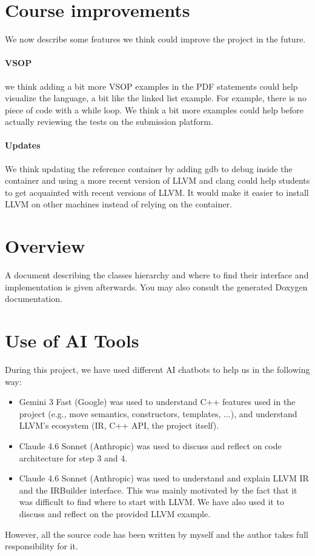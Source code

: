 \documentclass{article}
\begin{document}
\section{Course improvements}
We now describe some features we think could improve the project in the future.

\paragraph{VSOP} we think adding a bit more VSOP examples in the PDF statements could help visualize the language, a bit like the linked list example. For example, there is no piece of code with a while loop. We think a bit more examples could help before actually reviewing the tests on the submission platform.

\paragraph{Updates}
We think updating the reference container by adding gdb to debug inside the container and using a more recent version of LLVM and clang could help students to get acquainted with recent versions of LLVM. It would make it easier to install LLVM on other machines instead of relying on the container.

\appendix

\section{Overview}

A document describing the classes hierarchy and where to find their interface and implementation is given afterwards. You may also consult the generated Doxygen documentation.

\section{Use of AI Tools}

During this project, we have used different AI chatbots to help us in the following way:

\begin{itemize}
    \item Gemini 3 Fast (Google) was used to understand C++ features used in the project (e.g., move semantics, constructors, templates, ...), and understand LLVM's ecosystem (IR, C++ API, the project itself).
    \item Claude 4.6 Sonnet (Anthropic) was used to discuss and reflect on code architecture for step 3 and 4.
    \item Claude 4.6 Sonnet (Anthropic) was used to understand and explain LLVM IR and the IRBuilder interface. This was mainly motivated by the fact that it was difficult to find where to start with LLVM. We have also used it to discuss and reflect on the provided LLVM example.
\end{itemize}

However, all the source code has been written by myself and the author takes full responsibility for it.


\end{document}
